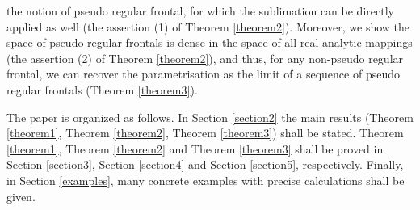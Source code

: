 \documentclass{amsart}
\theoremstyle{definition}
\theoremstyle{definition}
\theoremstyle{definition}
\begin{document}
the notion of pseudo regular frontal, for which the 
{\color{black}sublimation} can be directly applied 
{\color{black}as well (the assertion (1) of Theorem \ref{theorem2}).    
Moreover, w}e show the space of pseudo regular frontals is dense 
in the space of all {\color{black}real-analytic} mappings 
{\color{black}(the assertion (2) of Theorem \ref{theorem2})}, 
and thus, for {\color{black}any} non-pseudo regular frontal, 
we can recover the parametrisation as the limit of a sequence of 
pseudo regular frontals {\color{black}(Theorem \ref{theorem3})}. 
\par 
\medskip 
The paper is organized as follows.   
In Section \ref{section2} the main results 
(Theorem \ref{theorem1}, Theorem \ref{theorem2}, Theorem \ref{theorem3}) 
shall be stated.   
Theorem \ref{theorem1}, Theorem \ref{theorem2} and Theorem \ref{theorem3}  
shall be proved in Section \ref{section3}, Section \ref{section4} 
and Section \ref{section5}, respectively.     
Finally, in Section \ref{examples}, many concrete examples with precise 
calculations shall be given.   

\end{document}
